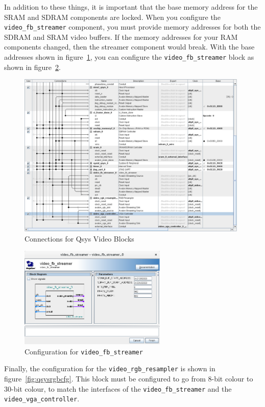 \documentclass{capstonedoc}
\begin{document}
In addition to these things, it is important that the base memory address for
the SRAM and SDRAM components are locked. When you configure the
\texttt{video\_fb\_streamer} component, you must provide memory addresses for
both the SDRAM and SRAM video buffers. If the memory addresses for your RAM
components changed, then the streamer component would break. With the base
addresses shown in figure~\ref{fig:qsysvideo}, you can configure the
\texttt{video\_fb\_streamer} block as shown in figure~\ref{fig:qsysvidfbcfg}.

\begin{figure}[ht]
  \centering
  \includegraphics[width=11cm]{qsys_connections_video}
  \caption{Connections for Qsys Video Blocks}
  \label{fig:qsysvideo}
\end{figure}

\begin{figure}[ht]
  \centering
  \includegraphics[width=7cm]{qsys_video_fb_streamer}
  \caption{Configuration for \texttt{video\_fb\_streamer}}
  \label{fig:qsysvidfbcfg}
\end{figure}

Finally, the configuration for the \texttt{video\_rgb\_resampler} is shown
in figure~\ref{fig:qsysrgbcfg}. This block must be configured to go from
8-bit colour to 30-bit colour, to match the interfaces of the
\texttt{video\_fb\_streamer} and the \texttt{video\_vga\_controller}.
\end{document}

